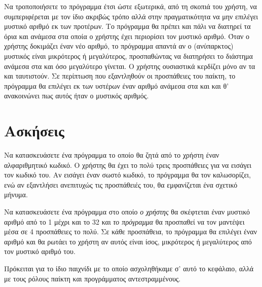 \documentclass[a4paper,11pt,oneside]{book}
\begin{document}
\begin{exercise}
Να τροποποιήσετε το πρόγραμμα έτσι ώστε εξωτερικά, από τη σκοπιά του χρήστη, να συμπεριφέρεται με τον ίδιο ακριβώς τρόπο αλλά στην πραγματικότητα να μην επιλέγει μυστικό αριθμό εκ των προτέρων. Το πρόγραμμα θα πρέπει και πάλι να διατηρεί τα όρια  και  ανάμεσα στα οποία ο χρήστης έχει περιορίσει τον μυστικό αριθμό. Όταν ο χρήστης δοκιμάζει έναν νέο αριθμό, το πρόγραμμα 
απαντά αν ο (ανύπαρκτος) μυστικός είναι μικρότερος ή μεγαλύτερος, προσπαθώντας να διατηρήσει το διάστημα ανάμεσα στα  και  όσο μεγαλύτερο γίνεται. Ο χρήστης ουσιαστικά κερδίζει μόνο αν τα  και  ταυτιστούν. Σε περίπτωση που εξαντληθούν οι προσπάθειες του παίκτη, το πρόγραμμα θα επιλέγει εκ των υστέρων έναν αριθμό ανάμεσα στα  και  και θ' ανακοινώνει πως αυτός ήταν ο μυστικός αριθμός.
\end{exercise}

\section{Ασκήσεις}

\begin{exercise}
Να κατασκευάσετε ένα πρόγραμμα το οποίο θα ζητά από το χρήστη έναν αλφαριθμητικό κωδικό. Ο χρήστης θα έχει το πολύ τρεις προσπάθειες για να εισάγει τον κωδικό του. Αν εισάγει έναν σωστό κωδικό, το πρόγραμμα θα τον καλωσορίζει, ενώ αν εξαντλήσει ανεπιτυχώς τις προσπάθειές του, θα εμφανίζεται ένα σχετικό μήνυμα. 
\end{exercise}

\begin{exercise}
Να κατασκευάσετε ένα πρόγραμμα στο οποίο \emph{ο χρήστης} θα σκέφτεται έναν μυστικό αριθμό από το 1 μέχρι και το 32 και \emph{το πρόγραμμα} θα προσπαθεί να τον μαντέψει μέσα σε 4 προσπάθειες το πολύ. Σε κάθε προσπάθεια, το πρόγραμμα θα επιλέγει έναν αριθμό και θα ρωτάει το χρήστη αν αυτός είναι ίσος, μικρότερος ή μεγαλύτερος από τον μυστικό αριθμό του.

\begin{note}
Πρόκειται για το ίδιο παιχνίδι με το οποίο ασχοληθήκαμε σ' αυτό το κεφάλαιο, αλλά με τους ρόλους παίκτη και προγράμματος αντεστραμμένους.
\end{note}
\end{exercise}
\end{document}
